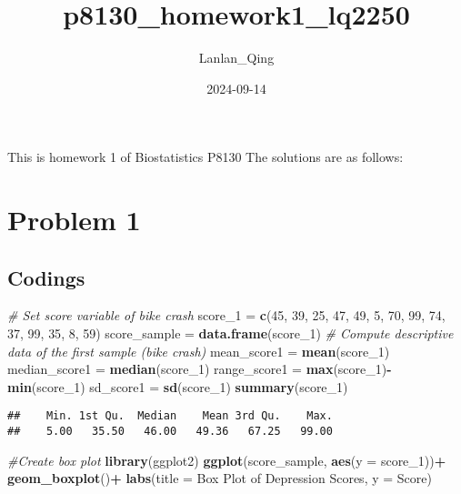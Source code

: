 \documentclass[
]{article}
\title{p8130\_homework1\_lq2250}
\author{Lanlan\_Qing}
\date{2024-09-14}
\newenvironment{Shaded}{\begin{snugshade}}{\end{snugshade}}
\newcommand{\AttributeTok}[1]{\textcolor[rgb]{0.13,0.29,0.53}{#1}}
\newcommand{\CommentTok}[1]{\textcolor[rgb]{0.56,0.35,0.01}{\textit{#1}}}
\newcommand{\DecValTok}[1]{\textcolor[rgb]{0.00,0.00,0.81}{#1}}
\newcommand{\FunctionTok}[1]{\textcolor[rgb]{0.13,0.29,0.53}{\textbf{#1}}}
\newcommand{\NormalTok}[1]{#1}
\newcommand{\OtherTok}[1]{\textcolor[rgb]{0.56,0.35,0.01}{#1}}
\newcommand{\SpecialCharTok}[1]{\textcolor[rgb]{0.81,0.36,0.00}{\textbf{#1}}}
\newcommand{\StringTok}[1]{\textcolor[rgb]{0.31,0.60,0.02}{#1}}
\begin{document}
\maketitle

This is homework 1 of Biostatistics P8130 The solutions are as follows:

\section{Problem 1}\label{problem-1}

\subsection{Codings}\label{codings}

\begin{Shaded}
\begin{Highlighting}[]
\CommentTok{\# Set score variable of bike crash}
\NormalTok{score\_1 }\OtherTok{=} \FunctionTok{c}\NormalTok{(}\DecValTok{45}\NormalTok{, }\DecValTok{39}\NormalTok{, }\DecValTok{25}\NormalTok{, }\DecValTok{47}\NormalTok{, }\DecValTok{49}\NormalTok{, }\DecValTok{5}\NormalTok{, }\DecValTok{70}\NormalTok{, }\DecValTok{99}\NormalTok{, }\DecValTok{74}\NormalTok{, }\DecValTok{37}\NormalTok{, }\DecValTok{99}\NormalTok{, }\DecValTok{35}\NormalTok{, }\DecValTok{8}\NormalTok{, }\DecValTok{59}\NormalTok{)}
\NormalTok{score\_sample }\OtherTok{=} \FunctionTok{data.frame}\NormalTok{(score\_1)}
\CommentTok{\# Compute descriptive data of the first sample (bike crash)}
\NormalTok{mean\_score1 }\OtherTok{=} \FunctionTok{mean}\NormalTok{(score\_1)}
\NormalTok{median\_score1 }\OtherTok{=} \FunctionTok{median}\NormalTok{(score\_1)}
\NormalTok{range\_score1 }\OtherTok{=} \FunctionTok{max}\NormalTok{(score\_1)}\SpecialCharTok{{-}}\FunctionTok{min}\NormalTok{(score\_1)}
\NormalTok{sd\_score1 }\OtherTok{=} \FunctionTok{sd}\NormalTok{(score\_1)}
\FunctionTok{summary}\NormalTok{(score\_1)}
\end{Highlighting}
\end{Shaded}

\begin{verbatim}
##    Min. 1st Qu.  Median    Mean 3rd Qu.    Max. 
##    5.00   35.50   46.00   49.36   67.25   99.00
\end{verbatim}

\begin{Shaded}
\begin{Highlighting}[]
\CommentTok{\#Create box plot}
\FunctionTok{library}\NormalTok{(ggplot2)}
\FunctionTok{ggplot}\NormalTok{(score\_sample, }\FunctionTok{aes}\NormalTok{(}\AttributeTok{y =}\NormalTok{ score\_1))}\SpecialCharTok{+}
  \FunctionTok{geom\_boxplot}\NormalTok{()}\SpecialCharTok{+}
  \FunctionTok{labs}\NormalTok{(}\AttributeTok{title =} \StringTok{\textquotesingle{}Box Plot of Depression Scores\textquotesingle{}}\NormalTok{,}
       \AttributeTok{y =} \StringTok{\textquotesingle{}Score\textquotesingle{}}\NormalTok{)}
\end{Highlighting}
\end{Shaded}
\end{document}
